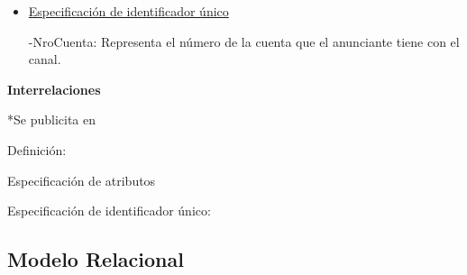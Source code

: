 \documentclass[a4paper,10pt,titlepage]{article}
\begin{document}
\begin{enumerate}
\begin{itemize}
\item \underline{Especificaci\'on de identificador \'unico}

-NroCuenta: Representa el n\'umero de la cuenta que el anunciante tiene con el canal.

\end{itemize}


{\bf Interrelaciones}


*Se publicita en

Definici\'on:

Especificaci\'on de atributos

Especificaci\'on de identificador \'unico:

\end{enumerate}

\pagebreak
\subsection{Modelo Relacional}
\end{document}
